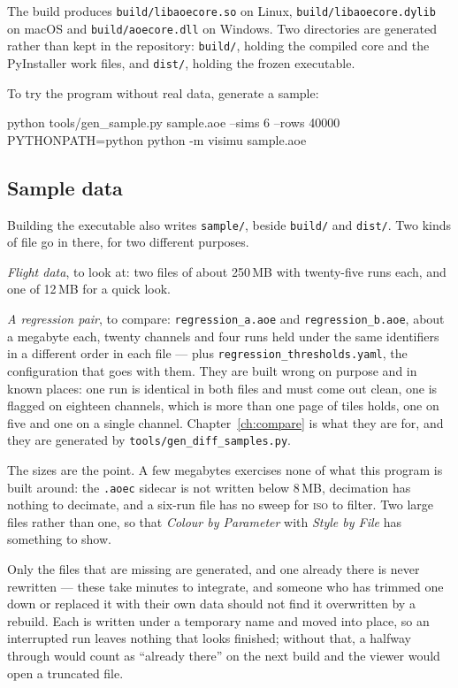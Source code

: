 \documentclass[11pt,a4paper,oneside]{report}
\newcommand{\code}[1]{\texttt{#1}}
\newcommand{\key}[1]{\textsf{\small\fbox{#1}}}
\newcommand{\tab}[1]{\textsc{#1}}
\begin{document}
The build produces \code{build/libaoecore.so} on Linux,
\code{build/libaoecore.dylib} on macOS and \code{build/aoecore.dll} on
Windows. Two directories are generated rather than kept in the repository:
\code{build/}, holding the compiled core and the PyInstaller work files, and
\code{dist/}, holding the frozen executable.

To try the program without real data, generate a sample:

\begin{aoecode}
python tools/gen_sample.py sample.aoe --sims 6 --rows 40000
PYTHONPATH=python python -m visimu sample.aoe
\end{aoecode}

\subsection{Sample data}
\label{sec:samples}

Building the executable also writes \code{sample/}, beside \code{build/} and
\code{dist/}. Two kinds of file go in there, for two different purposes.

\emph{Flight data}, to look at: two files of about 250\,MB with twenty-five
runs each, and one of 12\,MB for a quick look.

\emph{A regression pair}, to compare: \code{regression\_a.aoe} and
\code{regression\_b.aoe}, about a megabyte each, twenty channels and four
runs held under the same identifiers in a different order in each file --- plus
\code{regression\_thresholds.yaml}, the configuration that goes with them.
They are built wrong on purpose and in known places: one run is identical in
both files and must come out clean, one is flagged on eighteen channels, which
is more than one page of tiles holds, one on five and one on a single channel.
Chapter~\ref{ch:compare} is what they are for, and they are generated by
\code{tools/gen\_diff\_samples.py}.

The sizes are the point. A few megabytes exercises none of what this program is
built around: the \code{.aoec} sidecar is not written below 8\,MB, decimation
has nothing to decimate, and a six-run file has no sweep for \tab{iso} to
filter. Two large files rather than one, so that \emph{Colour by Parameter}
with \emph{Style by File} has something to show.

Only the files that are missing are generated, and one already there is never
rewritten --- these take minutes to integrate, and someone who has trimmed one
down or replaced it with their own data should not find it overwritten by a
rebuild. Each is written under a temporary name and moved into place, so an
interrupted run leaves nothing that looks finished; without that, a
\key{Ctrl+C} halfway through would count as ``already there'' on the next
build and the viewer would open a truncated file.
\end{document}
